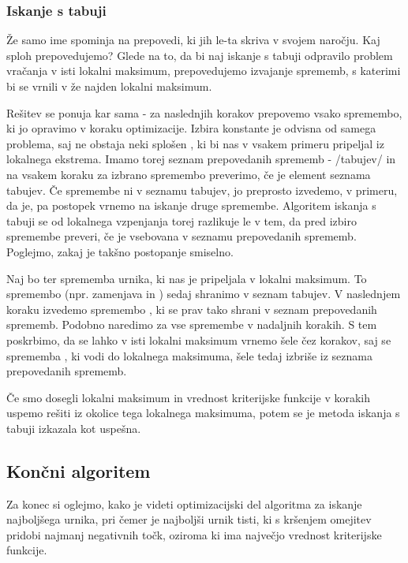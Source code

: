 \documentclass[10pt,a4paper]{article}
\begin{document}
\subsubsection{Iskanje s tabuji} %

Že samo ime spominja na prepovedi, ki jih le-ta skriva v svojem naročju. Kaj sploh prepovedujemo?
Glede na to, da bi naj iskanje s tabuji odpravilo problem vračanja v isti lokalni maksimum,
prepovedujemo izvajanje sprememb, s katerimi bi se vrnili v že najden lokalni maksimum.

Rešitev se ponuja kar sama - za naslednjih  korakov prepovemo vsako spremembo, ki jo
opravimo v koraku optimizacije. Izbira konstante  je odvisna od samega problema, saj
ne obstaja neki splošen , ki bi nas v vsakem primeru pripeljal iz lokalnega ekstrema.
Imamo torej seznam prepovedanih sprememb - /tabujev/ in na vsakem koraku za izbrano
spremembo preverimo, če je element seznama tabujev. Če spremembe ni v seznamu tabujev, jo
preprosto izvedemo, v primeru, da je, pa postopek vrnemo na iskanje druge spremembe.
Algoritem iskanja s tabuji se od lokalnega vzpenjanja torej razlikuje le v tem, da pred
izbiro spremembe preveri, če je vsebovana v seznamu prepovedanih sprememb. Poglejmo, zakaj
je takšno postopanje smiselno.

Naj bo  ter  sprememba urnika, ki nas je pripeljala v lokalni maksimum. To
spremembo (npr. zamenjava  in ) sedaj shranimo v
seznam tabujev. V naslednjem koraku izvedemo spremembo , ki se prav tako shrani v
seznam prepovedanih sprememb. Podobno naredimo za vse spremembe v nadaljnih korakih. S
tem poskrbimo, da se lahko v isti lokalni maksimum vrnemo šele čez  korakov, saj
se sprememba , ki vodi do lokalnega maksimuma, šele tedaj izbriše iz seznama
prepovedanih sprememb.

Če smo dosegli lokalni maksimum in vrednost kriterijske funkcije v  korakih uspemo
rešiti iz okolice tega lokalnega maksimuma, potem se je metoda iskanja s tabuji izkazala
kot uspešna.

\subsection{Končni algoritem} %

Za konec si oglejmo, kako je videti optimizacijski del algoritma za iskanje najboljšega
urnika, pri čemer je najboljši urnik tisti, ki s kršenjem omejitev pridobi najmanj negativnih
točk, oziroma ki ima največjo vrednost kriterijske funkcije.
\end{document}
